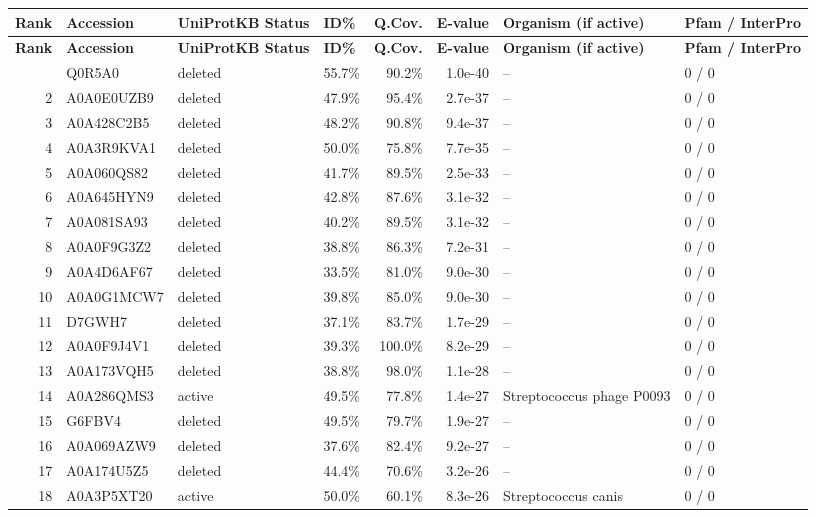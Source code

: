 \documentclass[10pt,letterpaper]{article}
\begin{document}
{\scriptsize\setlength{\tabcolsep}{3.5pt}\renewcommand{\arraystretch}{1.08}
\begin{longtable}{@{}rlllrrll@{}}
\toprule
\textbf{Rank} & \textbf{Accession} & \textbf{UniProtKB Status} & \textbf{ID\%} & \textbf{Q.Cov.} & \textbf{E-value} & \textbf{Organism (if active)} & \textbf{Pfam / InterPro} \\
\midrule
\endfirsthead
\toprule
\textbf{Rank} & \textbf{Accession} & \textbf{UniProtKB Status} & \textbf{ID\%} & \textbf{Q.Cov.} & \textbf{E-value} & \textbf{Organism (if active)} & \textbf{Pfam / InterPro} \\
\midrule
\endhead
\bottomrule
\endfoot
1 & Q0R5A0 & deleted & 55.7\% & 90.2\% & 1.0e-40 & -- & 0 / 0 \\
2 & A0A0E0UZB9 & deleted & 47.9\% & 95.4\% & 2.7e-37 & -- & 0 / 0 \\
3 & A0A428C2B5 & deleted & 48.2\% & 90.8\% & 9.4e-37 & -- & 0 / 0 \\
4 & A0A3R9KVA1 & deleted & 50.0\% & 75.8\% & 7.7e-35 & -- & 0 / 0 \\
5 & A0A060QS82 & deleted & 41.7\% & 89.5\% & 2.5e-33 & -- & 0 / 0 \\
6 & A0A645HYN9 & deleted & 42.8\% & 87.6\% & 3.1e-32 & -- & 0 / 0 \\
7 & A0A081SA93 & deleted & 40.2\% & 89.5\% & 3.1e-32 & -- & 0 / 0 \\
8 & A0A0F9G3Z2 & deleted & 38.8\% & 86.3\% & 7.2e-31 & -- & 0 / 0 \\
9 & A0A4D6AF67 & deleted & 33.5\% & 81.0\% & 9.0e-30 & -- & 0 / 0 \\
10 & A0A0G1MCW7 & deleted & 39.8\% & 85.0\% & 9.0e-30 & -- & 0 / 0 \\
11 & D7GWH7 & deleted & 37.1\% & 83.7\% & 1.7e-29 & -- & 0 / 0 \\
12 & A0A0F9J4V1 & deleted & 39.3\% & 100.0\% & 8.2e-29 & -- & 0 / 0 \\
13 & A0A173VQH5 & deleted & 38.8\% & 98.0\% & 1.1e-28 & -- & 0 / 0 \\
14 & A0A286QMS3 & active & 49.5\% & 77.8\% & 1.4e-27 & Streptococcus phage P0093 & 0 / 0 \\
15 & G6FBV4 & deleted & 49.5\% & 79.7\% & 1.9e-27 & -- & 0 / 0 \\
16 & A0A069AZW9 & deleted & 37.6\% & 82.4\% & 9.2e-27 & -- & 0 / 0 \\
17 & A0A174U5Z5 & deleted & 44.4\% & 70.6\% & 3.2e-26 & -- & 0 / 0 \\
18 & A0A3P5XT20 & active & 50.0\% & 60.1\% & 8.3e-26 & Streptococcus canis & 0 / 0 \\

\end{longtable}}
\end{document}
